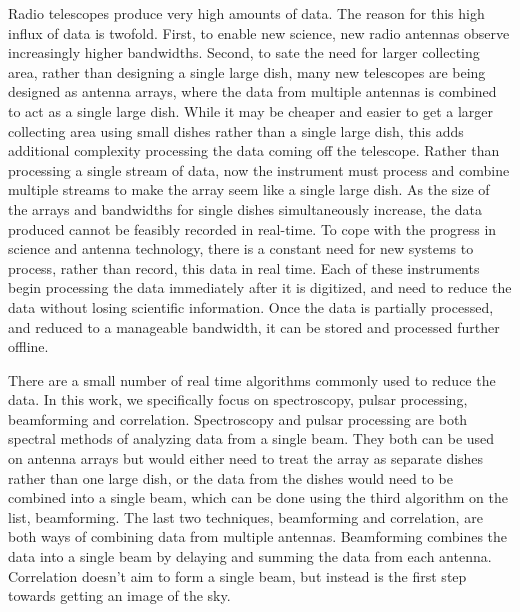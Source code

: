 Radio telescopes produce very high amounts of data. %
The reason for this high influx of data is twofold. 
First, to enable new science, new radio antennas observe increasingly higher bandwidths. 
Second, to sate the need for larger collecting area, rather than designing a single large dish, many new telescopes are being designed as antenna arrays, where the data from multiple antennas is combined to act as a single large dish.
While it may be cheaper and easier to get a larger collecting area using small dishes rather than a single large dish, this adds additional complexity processing the data coming off the telescope.
Rather than processing a single stream of data, now the instrument must process and combine multiple streams to make the array seem like a single large dish.
As the size of the arrays and bandwidths for single dishes simultaneously increase, the data produced cannot be feasibly recorded in real-time. 
To cope with the progress in science and antenna technology, there is a constant need for new systems to process, rather than record, this data in real time.
Each of these instruments begin processing the data immediately after it is digitized, and need to reduce the data without losing scientific information.
Once the data is partially processed, and reduced to a manageable bandwidth, it can be stored and processed further offline.


There are a small number of real time algorithms commonly used to reduce the data. 
In this work, we specifically focus on spectroscopy, pulsar processing, beamforming and correlation. 
Spectroscopy and pulsar processing are both spectral methods of analyzing data from a single beam.
They both can be used on antenna arrays but would either need to treat the array as separate dishes rather than one large dish, or the data from the dishes would need to be combined into a single beam, which can be done using the third algorithm on the list, beamforming. 
The last two techniques, beamforming and correlation, are both ways of combining data from multiple antennas. 
Beamforming combines the data into a single beam by delaying and summing the data from each antenna.
Correlation doesn't aim to form a single beam, but instead is the first step towards getting an image of the sky. 



